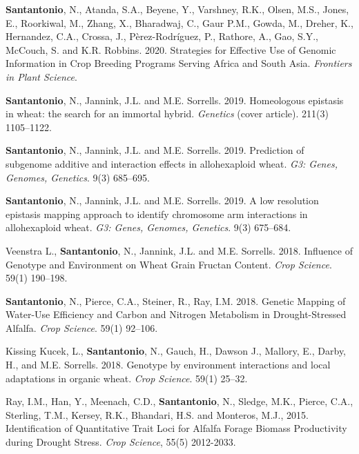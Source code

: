\documentclass[10pt]{article}
\renewcommand{\section}[1]{\pagebreak[3]%
    \vspace{1.3\baselineskip}%
    \phantomsection\addcontentsline{toc}{section}{#1}%
    \noindent\llap{\scshape\smash{\parbox[t]{\marginparwidth}{\hyphenpenalty=10000\raggedright #1}}}%
    \vspace{-\baselineskip}\par}
\begin{document}
\section{Publications}

\begin{bibenum}
    \item \textbf{Santantonio}, N., Atanda, S.A., Beyene, Y., Varshney, R.K., Olsen, M.S., Jones, E., Roorkiwal, M., Zhang, X., Bharadwaj, C., Gaur P.M., Gowda, M., Dreher, K., Hernandez, C.A., Crossa, J., P\`{e}rez-Rodr\'{i}guez, P., Rathore, A., Gao, S.Y., McCouch, S. and K.R. Robbins. 2020. Strategies for Effective Use of Genomic Information in Crop Breeding Programs Serving Africa and South Asia. \emph{Frontiers in Plant Science}. 

    \item \textbf{Santantonio}, N., Jannink, J.L. and M.E. Sorrells. 2019. Homeologous epistasis in wheat: the search for an immortal hybrid. \emph{Genetics} (cover article). 211(3) 1105--1122. \\ 

    \item \textbf{Santantonio}, N., Jannink, J.L. and M.E. Sorrells. 2019. Prediction of subgenome additive and interaction effects in allohexaploid wheat. \emph{G3: Genes, Genomes, Genetics}. 9(3) 685--695.  
    
    \item \textbf{Santantonio}, N., Jannink, J.L. and M.E. Sorrells. 2019. A low resolution epistasis mapping approach to identify chromosome arm interactions in allohexaploid wheat. \emph{G3: Genes, Genomes, Genetics}. 9(3) 675--684. 

    \item Veenstra L., \textbf{Santantonio}, N., Jannink, J.L. and M.E. Sorrells. 2018. Influence of Genotype and Environment on Wheat Grain Fructan Content. \emph{Crop Science}. 59(1) 190--198. 
    
    \item \textbf{Santantonio}, N., Pierce, C.A., Steiner, R., Ray, I.M. 2018. Genetic Mapping of Water-Use Efficiency and Carbon and Nitrogen Metabolism in Drought-Stressed Alfalfa. \emph{Crop Science}. 59(1) 92--106. 

    \item Kissing Kucek, L., \textbf{Santantonio}, N., Gauch, H., Dawson J., Mallory, E., Darby, H., and M.E. Sorrells. 2018. Genotype by environment interactions and local adaptations in organic wheat. \emph{Crop Science}. 59(1) 25--32. 

    \item Ray, I.M., Han, Y., Meenach, C.D., \textbf{Santantonio}, N., Sledge, M.K., Pierce, C.A., Sterling, T.M., Kersey, R.K., Bhandari, H.S. and Monteros, M.J., 2015. Identification of Quantitative Trait Loci for Alfalfa Forage Biomass Productivity during Drought Stress. \emph{Crop Science}, 55(5) 2012-2033.    

\end{bibenum}
\end{document}
